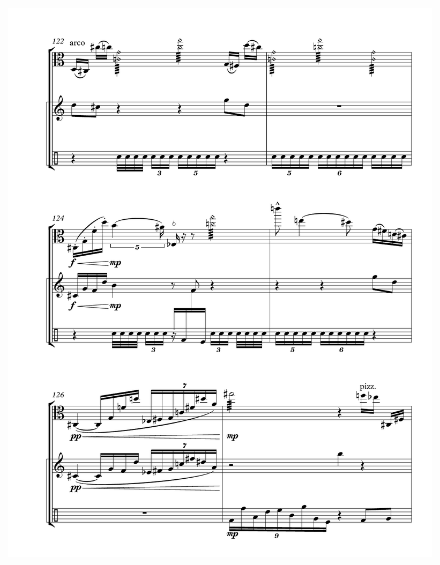 \begin{figure}[htbp]
    \centering
	\includegraphics[width=6.5in]{figures/Viola_Percussion_17.pdf}
\end{figure}

